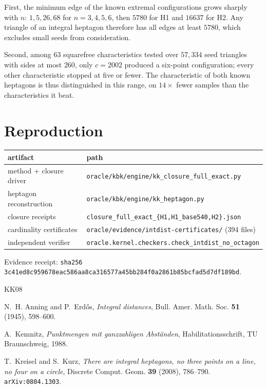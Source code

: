 \documentclass[11pt,reqno]{amsart}
\theoremstyle{plain}
\numberwithin{equation}{section}
\begin{document}
First, the minimum edge of the known extremal configurations grows sharply with $n$: $1,5,26,68$ for
$n=3,4,5,6$, then $5780$ for H1 and $16637$ for H2. Any triangle of an integral heptagon therefore has
all edges at least $5780$, which excludes small seeds from consideration.

Second, among $63$ squarefree characteristics tested over $57{,}334$ seed triangles with sides at most
$260$, only $c=2002$ produced a six-point configuration; every other characteristic stopped at five or
fewer. The characteristic of both known heptagons is thus distinguished in this range, on $14\times$
fewer samples than the characteristics it beat.

\section{Reproduction}

\begin{center}
\begin{tabular}{ll}
\toprule
artifact & path\\
\midrule
method + closure driver & \texttt{oracle/kbk/engine/kk\_closure\_full\_exact.py}\\
heptagon reconstruction & \texttt{oracle/kbk/engine/kk\_heptagon.py}\\
closure receipts & \texttt{closure\_full\_exact\_\{H1,H1\_base540,H2\}.json}\\
cardinality certificates & \texttt{oracle/evidence/intdist-certificates/} (394 files)\\
independent verifier & \texttt{oracle.kernel.checkers.check\_intdist\_no\_octagon}\\
\bottomrule
\end{tabular}
\end{center}

\noindent Evidence receipt: \texttt{sha256
3c41ed8c959678eac586aa8ca316577a45bb284f0a2861b85bcfad5d7df189bd}.

\begin{thebibliography}{KK08}

N.~H. Anning and P.~Erd\H{o}s,
\emph{Integral distances},
Bull. Amer. Math. Soc. \textbf{51} (1945), 598--600.

A.~Kemnitz,
\emph{Punktmengen mit ganzzahligen Abst\"anden},
Habilitationsschrift, TU Braunschweig, 1988.

T.~Kreisel and S.~Kurz,
\emph{There are integral heptagons, no three points on a line, no four on a circle},
Discrete Comput. Geom. \textbf{39} (2008), 786--790.
\texttt{arXiv:0804.1303}.

\end{thebibliography}
\end{document}
